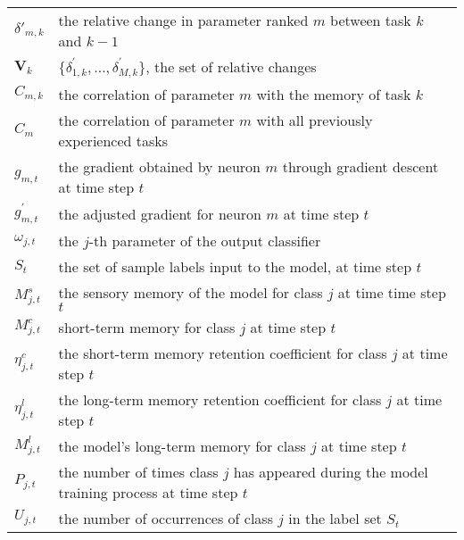 \begin{table*}[htbp]
\begin{tabularx}{\textwidth}{p{}X}
        $\delta'_{m,k}$     &  the relative change in parameter ranked $m$ between task \( k \) and \( k-1 \) \\
		$\boldsymbol{V}_k$   & $\{\delta_{1,k}^{'}, \ldots, \delta^{'}_{M,k}\}$, the set of relative changes\\
		$C_{m,k}$ &  the correlation of parameter $m$ with the memory of task $k$\\
		$C_m$   &  the correlation of parameter $m$ with all previously experienced tasks\\
		$g_{m,t}$ & the gradient obtained by neuron $m$ through gradient descent at time step $t$\\
		$g_{m,t}^{'}$   & the adjusted gradient for neuron $m$ at time step $t$\\
		$\omega_{j,t}$  & the $j$-th parameter of the output classifier\\
		$S_t$   & the set of sample labels input to the model, at time step $t$  \\
		$M^s_{j,t}$   & the sensory memory of the model for class $j$ at time time step $t$  \\
		$M^c_{j,t}$ & short-term memory for class $j$ at time step $t$ \\
		$\eta^c_{j,t}$   &  the short-term memory retention coefficient for class $j$ at time step $t$\\
  	$\eta^l_{j,t}$   &  the long-term memory retention coefficient for class $j$ at time step $t$\\
		$M^l_{j,t}$   &  the model's long-term memory for class $j$ at time step $t$ \\
        $P_{j,t}$   &  the number of times class $j$ has appeared during the model training process at time step $t$ \\
        $U_{j,t}$   &  the number of occurrences of class $j$ in the label set $S_t$ \\
		\bottomrule
	\end{tabularx}
\end{table*}
\fi